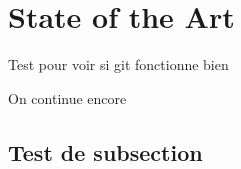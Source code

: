 \section{State of the Art}


Test pour voir si git fonctionne bien

On continue encore  
\subsection{Test de subsection}
